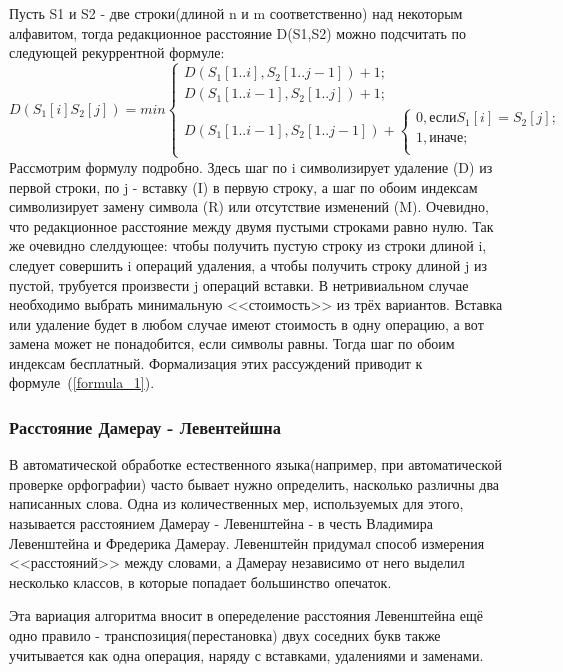 \documentclass[a4paper]{article}
\begin{document}
	Пусть S1 и S2 - две строки(длиной n и m соответственно) над некоторым алфавитом, тогда редакционное расстояние D(S1,S2) можно подсчитать по следующей рекуррентной формуле:
	\begin{equation} 
		D(S_1[i]S_2[j]) = min 
			\begin{cases}
				D(S_1[1..i], S_2[1..j-1]) + 1;\\
				D(S_1[1..i-1], S_2[1..j]) + 1;\\
				D(S_1[1..i-1], S_2[1..j-1]) + \begin{cases}
					0, \text {если}  S_1[i] = S_2[j];\\
					1, \text{иначе};\\
				\end{cases}	
			\end{cases}
	\label{formula_1}
	\end{equation}
	Рассмотрим формулу подробно. Здесь шаг по i символизирует удаление (D) из первой строки, по j - вставку (I) в первую строку, а шаг по обоим индексам символизирует замену символа (R) или отсутствие изменений (M). Очевидно, что редакционное расстояние между двумя пустыми строками равно нулю. Так же очевидно слелдующее: чтобы получить пустую строку из строки длиной i, следует совершить i операций удаления, а чтобы получить строку длиной j из пустой, трубуется произвести j операций вставки. В нетривиальном случае необходимо выбрать минимальную <<стоимость>> из трёх вариантов. Вставка или удаление будет в любом случае имеют стоимость  в одну операцию, а вот замена может не понадобится, если символы равны. Тогда шаг по обоим индексам бесплатный. Формализация этих рассуждений приводит к формуле~(\ref{formula_1}).
	\subsubsection{Расстояние Дамерау - Левентейшна}
	В автоматической обработке естественного языка(например, при автоматической проверке орфографии) часто бывает нужно определить, насколько различны два написанных слова. Одна из количественных мер, используемых для этого, называется расстоянием Дамерау - Левенштейна - в честь Владимира Левенштейна и Фредерика Дамерау. Левенштейн придумал способ измерения <<расстояний>> между словами, а Дамерау независимо от него выделил несколько классов, в которые попадает большинство опечаток.
	
	Эта вариация алгоритма вносит в опеределение расстояния Левенштейна ещё одно правило - транспозиция(перестановка) двух соседних букв также учитывается как одна операция, наряду с вставками, удалениями и заменами.
	
\end{document}
